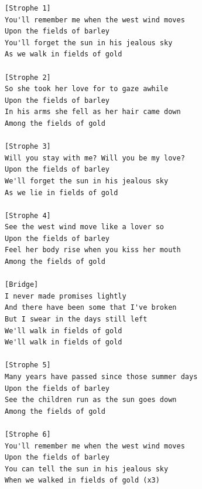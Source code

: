 \begin{small}
\begin{verbatim}
[Strophe 1]
You'll remember me when the west wind moves
Upon the fields of barley
You'll forget the sun in his jealous sky
As we walk in fields of gold

[Strophe 2]
So she took her love for to gaze awhile
Upon the fields of barley
In his arms she fell as her hair came down
Among the fields of gold

[Strophe 3]
Will you stay with me? Will you be my love?
Upon the fields of barley
We'll forget the sun in his jealous sky
As we lie in fields of gold

[Strophe 4]
See the west wind move like a lover so
Upon the fields of barley
Feel her body rise when you kiss her mouth
Among the fields of gold

[Bridge]
I never made promises lightly
And there have been some that I've broken
But I swear in the days still left
We'll walk in fields of gold
We'll walk in fields of gold

[Strophe 5]
Many years have passed since those summer days
Upon the fields of barley
See the children run as the sun goes down
Among the fields of gold

[Strophe 6]
You'll remember me when the west wind moves
Upon the fields of barley
You can tell the sun in his jealous sky
When we walked in fields of gold (x3)
\end{verbatim}
\end{small}